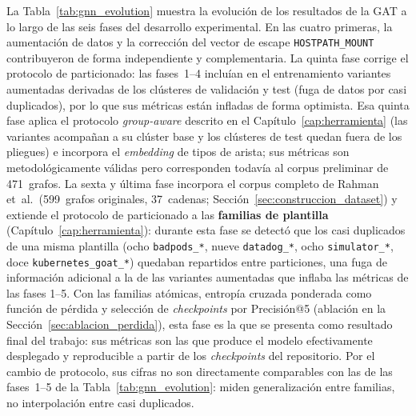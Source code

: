 La Tabla~\ref{tab:gnn_evolution} muestra la evolución de los resultados de la
\ac{GAT} a lo largo de las seis fases del desarrollo experimental. En las cuatro
primeras, la aumentación de datos y la corrección del vector de escape
\texttt{HOSTPATH\_MOUNT} contribuyeron de forma independiente y complementaria. La quinta fase corrige el protocolo de particionado: las fases~1--4
incluían en el entrenamiento variantes aumentadas derivadas de los
clústeres de validación y test (fuga de datos por casi duplicados), por lo que sus
métricas están infladas de forma optimista. Esa quinta fase aplica el protocolo
\textit{group-aware} descrito en el Capítulo~\ref{cap:herramienta} (las variantes acompañan a su
clúster base y los clústeres de test quedan fuera de los pliegues) e incorpora el
\textit{embedding} de tipos de arista; sus métricas son metodológicamente válidas
pero corresponden todavía al corpus preliminar de 471~grafos. La sexta y última
fase incorpora el corpus completo de Rahman et~al.\ (599~grafos originales,
37~cadenas; Sección~\ref{sec:construccion_dataset}) y extiende el protocolo de
particionado a las \textbf{familias de plantilla} (Capítulo~\ref{cap:herramienta}):
durante esta fase se detectó que los casi duplicados de una misma plantilla
(ocho \texttt{badpods\_*}, nueve \texttt{datadog\_*}, ocho
\texttt{simulator\_*}, doce \texttt{kubernetes\_goat\_*}) quedaban repartidos
entre particiones, una fuga de información adicional a la de las variantes
aumentadas que inflaba las métricas de las fases 1--5. Con las familias atómicas,
entropía cruzada ponderada como función de pérdida y selección de
\textit{checkpoints} por Precisión@5 (ablación en la
Sección~\ref{sec:ablacion_perdida}), esta fase es la que se presenta como
resultado final del trabajo: sus métricas son las que produce el modelo
efectivamente desplegado y reproducible a partir de los \textit{checkpoints} del
repositorio. Por el cambio de protocolo, sus cifras no son directamente
comparables con las de las fases~1--5 de la Tabla~\ref{tab:gnn_evolution}: miden
generalización entre familias, no interpolación entre casi duplicados.

